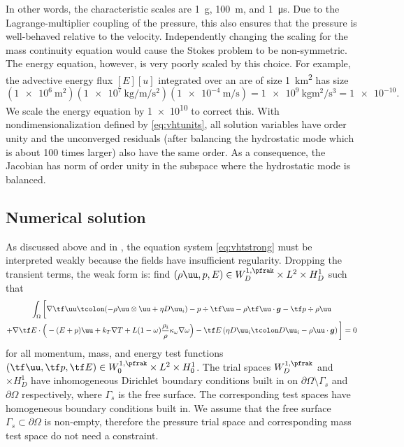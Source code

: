 In other words, the characteristic scales are \SI{1}{\gram}, \SI{100}{\metre}, and \SI{1}{\micro\second}.
Due to the Lagrange-multiplier coupling of the pressure, this also ensures that the pressure is well-behaved relative to the velocity.
Independently changing the scaling for the mass continuity equation would cause the Stokes problem to be non-symmetric.
The energy equation, however, is very poorly scaled by this choice.
For example, the advective energy flux $[E][u]$ integrated over an are of size \SI{1}{\kilo\metre\squared} has size
\begin{equation*}
  (\SI{1e6}{\metre\squared}) (\SI{1e7}{\kilo\gram\per\metre\per\second\squared}) (\SI{1e-4}{\metre\per\second}) = \SI{1e9}{\kilo\gram\metre\squared\per\second\cubed} = \num{1e-10} .
\end{equation*}
We scale the energy equation by \num{1e10} to correct this.
With nondimensionalization defined by \eqref{eq:vhtunits}, all solution variables have order unity and the unconverged residuals (after balancing the hydrostatic mode which is about 100 times larger) also have the same order.
As a consequence, the Jacobian has norm of order unity in the subspace where the hydrostatic mode is balanced.

\subsection{Numerical solution}\label{sec:vhtalgebraic}
As discussed above and in , the equation system \eqref{eq:vhtstrong} must be interpreted weakly because the fields have insufficient regularity.
Dropping the transient terms, the weak form is: find $(\rho\uu,p,E) \in W^{1,\pfrak}_D \times L^2 \times H^1_D$ such that
\begin{multline}\label{eq:vhtweak}
  \int_\Omega \bigg[
    \nabla\tf\uu \tcolon ( -\rho\uu\otimes\uu + \eta D\uu_i) - p\div\tf\uu - \rho \tf\uu\cdot \bm g -\tf p \div \rho\uu \\
    + \nabla\tf E \cdot \Big(
      -(E+p)\uu + k_T\nabla T + L (1-\omega)\frac{\rho_i}{\rho}\kappa_\omega\nabla\omega
    \Big) - \tf E \left( \eta D\uu_i\tcolon D\uu_i - \rho\uu\cdot\bm g \right)
    \bigg] = 0
\end{multline}
for all momentum, mass, and energy test functions $(\tf\uu,\tf p,\tf E) \in W^{1,\pfrak}_0 \times L^2 \times H^1_0$.
The trial spaces $W^{1,\pfrak}_D$ and $\times H^1_D$ have inhomogeneous Dirichlet boundary conditions built in on $\partial\Omega\setminus \Gamma_s$ and $\partial\Omega$ respectively, where $\Gamma_s$ is the free surface.
The corresponding test spaces have homogeneous boundary conditions built in.
We assume that the free surface $\Gamma_s \subset \partial\Omega$ is non-empty, therefore the pressure trial space and corresponding mass test space do not need a constraint.

